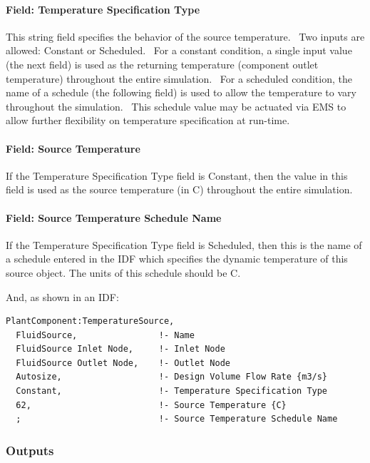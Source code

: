 \paragraph{Field: Temperature Specification Type}\label{field-temperature-specification-type}

This string field specifies the behavior of the source temperature.~ Two inputs are allowed: Constant or Scheduled.~ For a constant condition, a single input value (the next field) is used as the returning temperature (component outlet temperature) throughout the entire simulation.~ For a scheduled condition, the name of a schedule (the following field) is used to allow the temperature to vary throughout the simulation.~ This schedule value may be actuated via EMS to allow further flexibility on temperature specification at run-time.

\paragraph{Field: Source Temperature}\label{field-source-temperature}

If the Temperature Specification Type field is Constant, then the value in this field is used as the source temperature (in C) throughout the entire simulation.

\paragraph{Field: Source Temperature Schedule Name}\label{field-source-temperature-schedule-name}

If the Temperature Specification Type field is Scheduled, then this is the name of a schedule entered in the IDF which specifies the dynamic temperature of this source object. The units of this schedule should be C.

And, as shown in an IDF:

\begin{lstlisting}
PlantComponent:TemperatureSource,
  FluidSource,                !- Name
  FluidSource Inlet Node,     !- Inlet Node
  FluidSource Outlet Node,    !- Outlet Node
  Autosize,                   !- Design Volume Flow Rate {m3/s}
  Constant,                   !- Temperature Specification Type
  62,                         !- Source Temperature {C}
  ;                           !- Source Temperature Schedule Name
\end{lstlisting}

\subsubsection{Outputs}\label{outputs-16-000}

